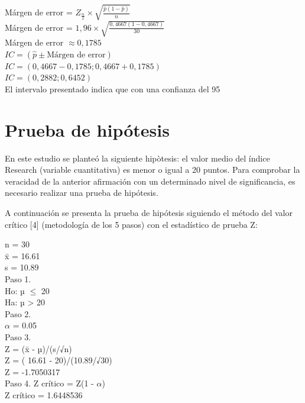 \documentclass[
]{article}
\begin{document}
\begin{multicols}{2}
Márgen de error = $Z_{\frac{\alpha}{2}} \times \sqrt{\frac{\hat{p}(1-\hat{p})}{n}}$\\
Márgen de error = $1,96 \times \sqrt{\frac{0,4667(1-0,4667)}{30}}$\\
Márgen de error $\approx 0,1785$\\

$IC = (\hat{p} \pm \text{Márgen de error})$\\
$IC = (0,4667 - 0,1785 ; 0,4667 + 0,1785)$\\
$IC = (0,2882 ; 0,6452)$\\

El intervalo presentado indica que con una confianza del 95%

\section{Prueba de hipótesis}



En este estudio se planteó la siguiente hipòtesis: el valor medio del índice Research (variable cuantitativa) es menor o igual a 20 puntos. Para comprobar la veracidad de la anterior afirmación con un determinado nivel de significancia, es necesario realizar una prueba de hipótesis.

A continuación se presenta la prueba de hipótesis siguiendo el método del valor crítico [4] (metodología de los 5 pasos) con el estadístico de prueba Z:

n = 30\\
x̄ = 16.61\\
s =  10.89\\

Paso 1.\\
Ho: µ $≤$ 20\\
Ha: µ > 20\\

Paso 2.\\
$\alpha$ = 0.05\\

Paso 3.\\
Z = (x̄ - µ)/(s/√n)\\
Z = ( 16.61 - 20)/(10.89/√30)\\
Z = -1.7050317\\

Paso 4.
Z crítico = Z(1 - $\alpha$)\\
Z crítico = 1.6448536\\


\end{multicols}
\end{document}
